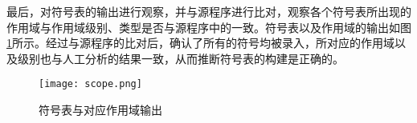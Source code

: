\par 最后，对符号表的输出进行观察，并与源程序进行比对，观察各个符号表所出现的作用域与作用域级别、类型是否与源程序中的一致。符号表以及作用域的输出如图\ref{fig:scope}所示。经过与源程序的比对后，确认了所有的符号均被录入，所对应的作用域以及级别也与人工分析的结果一致，从而推断符号表的构建是正确的。

\begin{figure}[htpb]
    \centering
    \texttt{[image: scope.png]}
    \caption{符号表与对应作用域输出}
    \label{fig:scope}
\end{figure}


